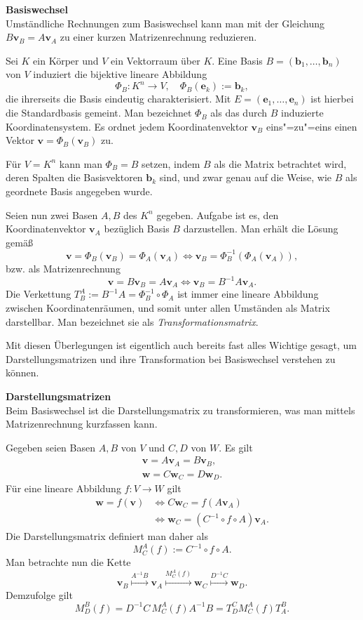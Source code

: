 \documentclass[paper=180mm:225mm,pagesize=auto,fleqn,twoside,11pt,dvipdfmx]{scrartcl}
\theoremstyle{rmbox}
\newenvironment{Rezept}[1]{\strong{#1}\\}{}
\newcommand{\strong}[1]{\textsf{\textbf{#1}}}
\newcommand{\bv}[1]{\mathbf{#1}}
\begin{document}
\newpage
\begin{Rezept}{Basiswechsel}
Umständliche Rechnungen zum Basiswechsel kann man mit der
Gleichung $B\bv v_B = A\bv v_A$ zu einer kurzen Matrizenrechnung
reduzieren.
\end{Rezept}

\noindent
Sei $K$ ein Körper und $V$ ein Vektorraum über $K$.
Eine Basis $B=(\bv b_1,\ldots, \bv b_n)$ von $V$ induziert die
bijektive lineare Abbildung
\[\Phi_B\colon K^n\to V,\quad \Phi_B(\bv e_k) := \bv b_k,\]
die ihrerseits die Basis eindeutig charakterisiert. Mit
$E=(\bv e_1,\ldots,\bv e_n)$ ist hierbei die Standardbasis gemeint.
Man bezeichnet $\Phi_B$ als das durch $B$ induzierte Koordinatensystem.
Es ordnet jedem Koordinatenvektor $\bv v_B$ eins"=zu"=eins einen Vektor
$\bv v = \Phi_B(\bv v_B)$ zu.

Für $V=K^n$ kann man $\Phi_B=B$ setzen, indem $B$ als die Matrix
betrachtet wird, deren Spalten die Basisvektoren $\bv b_k$ sind,
und zwar genau auf die Weise, wie $B$ als geordnete Basis angegeben
wurde.

Seien nun zwei Basen $A,B$ des $K^n$ gegeben. Aufgabe ist es, den
Koordinatenvektor $\bv v_A$ bezüglich Basis $B$ darzustellen.
Man erhält die Lösung gemäß
\[\bv v = \Phi_B(\bv v_B) = \Phi_A(\bv v_A) \iff
\bv v_B = \Phi_B^{-1}(\Phi_A(\bv v_A)),\]
bzw. als Matrizenrechnung
\[\bv v = B\bv v_B = A\bv v_A\iff
\bv v_B = B^{-1}A\bv v_A.\]
Die Verkettung $T_B^A := B^{-1}A = \Phi_B^{-1}\circ\Phi_A$
ist immer eine lineare Abbildung zwischen
Koordinatenräumen, und somit unter allen Umständen als Matrix
darstellbar. Man bezeichnet sie als \emph{Transformationsmatrix}.

Mit diesen Überlegungen ist eigentlich auch bereits fast alles
Wichtige gesagt, um Darstellungsmatrizen und ihre Transformation
bei Basiswechsel verstehen zu können.

\begin{Rezept}{Darstellungsmatrizen}
Beim Basiswechsel ist die Darstellungsmatrix zu transformieren,
was man mittels Matrizenrechnung kurzfassen kann.
\end{Rezept}

\noindent
Gegeben seien Basen $A,B$ von $V$ und $C,D$ von $W$. Es gilt%
\begin{gather*}
\bv v = A\bv v_A = B\bv v_B,\\
\bv w = C\bv w_C = D\bv w_D.
\end{gather*}
Für eine lineare Abbildung $f\colon V\to W$ gilt%
\begin{align*}
\bv w = f(\bv v)&\iff C\bv w_C = f(A\bv v_A)\\
&\iff \bv w_C = (C^{-1}\circ f\circ A)\bv v_A.
\end{align*}
Die Darstellungsmatrix definiert man daher als%
\[M_C^A(f) := C^{-1}\circ f\circ A.\]
Man betrachte nun die Kette%
\[\bv v_B\stackrel{A^{-1}B}\longmapsto \bv v_A
\stackrel{M_C^A(f)}\longmapsto \bv w_C
\stackrel{D^{-1}C}\longmapsto \bv w_D.\]
Demzufolge gilt
\[M_D^B(f) = D^{-1}C\,M_C^A(f)A^{-1}B = T_D^C M_C^A(f) T_A^B.\]
\end{document}
